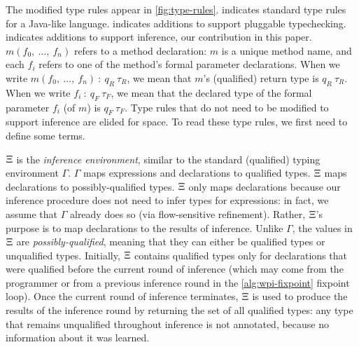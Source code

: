 \begin{figure*}
  \caption{Modified type rules used by our pluggable type framework.  indicates
    standard type rules for a Java-like language.  indicates additions to support
    pluggable typechecking.  indicates additions to support inference, \ie our
    contribution in this paper.
    Throughout, ``R'' subscripts refer to return types; ``F'' to formal parameters; ``A'' to
    actual arguments; and ``I'' to inference results.
    In an assignment \<x=y>, \<x> is the ``formal'' and \<y> is the ``actual''.
    In the \textsc{OVERRIDE} rule, the subscripts ``B'' and ``P'' are mneumonics
    for ``suBtype'' and ``suPertype'', referring the overriding method and the overidden
    method, respectively.
    Type rules that do not require modification to support inference
    are elided for space.}
  \label{fig:type-rules}
\end{figure*}

The modified type rules appear in \cref{fig:type-rules}.  indicates
standard type rules for a Java-like language.  indicates additions to support
pluggable typechecking.  indicates additions to support inference, \ie our
contribution in this paper.
%
$m(f_0,~\ldots,~f_n)$ refers to a method declaration: $m$ is a unique method name,
and each $f_i$ refers to one of the method's formal parameter declarations. When
we write $m(f_0,~\ldots,~f_n)~:~q_R~\tau_R$, we mean that $m$'s (qualified) return
type is $q_R~\tau_R$. When we write $f_i~:~q_F~\tau_F$, we mean that the declared
type of the formal parameter $f_i$ (of $m$) is $q_F~\tau_F$.
%
Type rules that do not need to be modified to support inference are elided for space.
%
To read these type rules, we first need to define some terms.

$\Xi$ is the \emph{inference environment}, similar to the standard (qualified)
typing environment $\Gamma$. $\Gamma$ maps expressions and declarations to qualified types.
$\Xi$ maps declarations to possibly-qualified types.
$\Xi$ only maps declarations because our inference procedure does not need to infer
types for expressions: in fact, we assume that $\Gamma$ already does so (via flow-sensitive
refinement). Rather, $\Xi$'s purpose is to map declarations to the results of inference.
Unlike $\Gamma$, the values in $\Xi$ are \emph{possibly-qualified}, meaning that they can either
be qualified types or unqualified types. Initially, $\Xi$ contains qualified types only
for declarations that were qualified before the current round of inference (which may come from
the programmer or from a previous inference round in the \cref{alg:wpi-fixpoint} fixpoint loop).
Once the current round of inference terminates, $\Xi$ is used to produce the results of the
inference round by returning the set of all qualified types: any type that remains unqualified
throughout inference is not annotated, because no information about it was learned.

